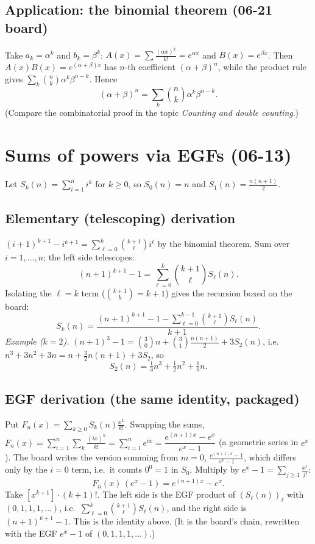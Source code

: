\documentclass[11pt]{article}
\begin{document}
\subsection*{Application: the binomial theorem (06-21 board)}

Take $a_k=\alpha^k$ and $b_k=\beta^k$: $A(x)=\sum\frac{(\alpha x)^k}{k!}=e^{\alpha x}$ and $B(x)=e^{\beta x}$. Then $A(x)B(x)=e^{(\alpha+\beta)x}$ has $n$-th coefficient $(\alpha+\beta)^n$, while the product rule gives $\sum_k\binom nk\alpha^k\beta^{n-k}$. Hence
\[
(\alpha+\beta)^n=\sum_k\binom nk\alpha^k\beta^{n-k}.
\]
(Compare the combinatorial proof in the topic \emph{Counting and double counting}.)

\section{Sums of powers via EGFs (06-13)}

Let $S_k(n)=\sum_{i=1}^ni^k$ for $k\ge0$, so $S_0(n)=n$ and $S_1(n)=\frac{n(n+1)}2$.

\subsection*{Elementary (telescoping) derivation}

$(i+1)^{k+1}-i^{k+1}=\sum_{\ell=0}^k\binom{k+1}\ell i^\ell$ by the binomial theorem. Sum over $i=1,\dots,n$; the left side telescopes:
\[
(n+1)^{k+1}-1=\sum_{\ell=0}^k\binom{k+1}\ell S_\ell(n).
\]
Isolating the $\ell=k$ term ($\binom{k+1}k=k+1$) gives the recursion boxed on the board:
\[
S_k(n)=\frac{(n+1)^{k+1}-1-\sum_{\ell=0}^{k-1}\binom{k+1}\ell S_\ell(n)}{k+1}.
\]
\emph{Example ($k=2$).} $(n+1)^3-1=\binom30n+\binom31\frac{n(n+1)}2+3S_2(n)$, i.e.\ $n^3+3n^2+3n=n+\frac32n(n+1)+3S_2$, so
\[
S_2(n)=\tfrac13n^3+\tfrac12n^2+\tfrac16n.
\]

\subsection*{EGF derivation (the same identity, packaged)}

Put $F_n(x)=\sum_{k\ge0}S_k(n)\frac{x^k}{k!}$. Swapping the sums, $F_n(x)=\sum_{i=1}^n\sum_k\frac{(ix)^k}{k!}=\sum_{i=1}^ne^{ix}=\dfrac{e^{(n+1)x}-e^x}{e^x-1}$ (a geometric series in $e^x$). The board writes the version summing from $m=0$, $\frac{e^{(n+1)x}-1}{e^x-1}$, which differs only by the $i=0$ term, i.e.\ it counts $0^0=1$ in $S_0$. Multiply by $e^x-1=\sum_{j\ge1}\frac{x^j}{j!}$:
\[
F_n(x)\,(e^x-1)=e^{(n+1)x}-e^x.
\]
Take $[x^{k+1}]\cdot(k+1)!$. The left side is the EGF product of $(S_\ell(n))_\ell$ with $(0,1,1,1,\dots)$, i.e.\ $\sum_{\ell=0}^{k}\binom{k+1}\ell S_\ell(n)$, and the right side is $(n+1)^{k+1}-1$. This is the identity above. (It is the board's chain, rewritten with the EGF $e^x-1$ of $(0,1,1,1,\dots)$.)
\end{document}
